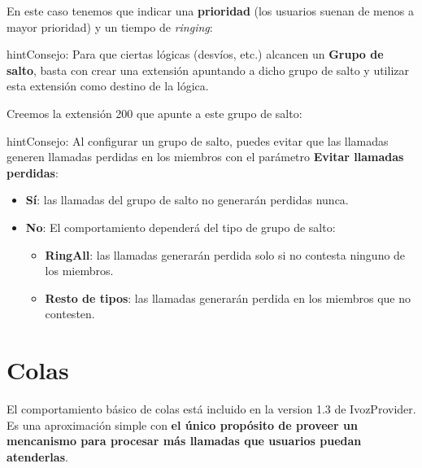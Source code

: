 \documentclass[letterpaper,10pt,spanish]{sphinxmanual}
\begin{document}
\noindent{}

En este caso tenemos que indicar una \textbf{prioridad} (los usuarios suenan de menos a mayor prioridad) y un tiempo de \emph{ringing}:

\noindent{}

\begin{notice}{hint}{Consejo:}
Para que ciertas lógicas (desvíos, etc.) alcancen un \textbf{Grupo de salto}, basta con crear una extensión apuntando a dicho grupo de salto y utilizar esta extensión como destino de la lógica.
\end{notice}

Creemos la extensión 200 que apunte a este grupo de salto:

\noindent{}

\begin{notice}{hint}{Consejo:}
Al configurar un grupo de salto, puedes evitar que las llamadas generen llamadas perdidas en los miembros con el parámetro \textbf{Evitar llamadas perdidas}:
\begin{itemize}
\item {} 
\textbf{Sí}: las llamadas del grupo de salto no generarán perdidas nunca.

\item {} 
\textbf{No}: El comportamiento dependerá del tipo de grupo de salto:
\begin{itemize}
\item {} 
\textbf{RingAll}: las llamadas generarán perdida solo si no contesta ninguno de los miembros.

\item {} 
\textbf{Resto de tipos}: las llamadas generarán perdida en los miembros que no contesten.

\end{itemize}

\end{itemize}
\end{notice}


\section{Colas}
\label{pbx_features/queues:queues}\label{pbx_features/queues::doc}
El comportamiento básico de colas está incluido en la version 1.3 de IvozProvider. Es una aproximación simple con \textbf{el único propósito de proveer un mencanismo para procesar más llamadas que usuarios puedan atenderlas}.
\end{document}
